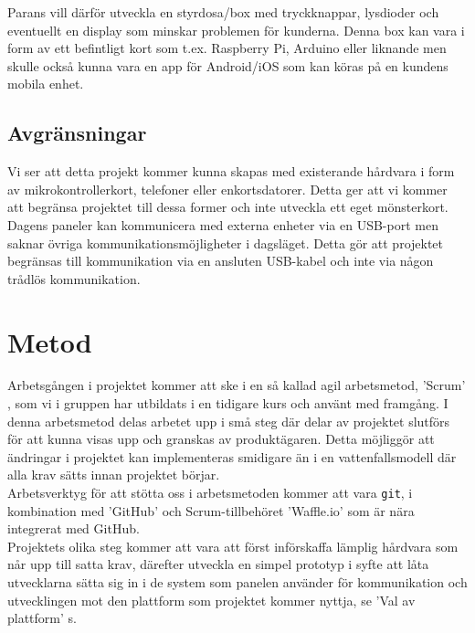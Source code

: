 \documentclass[a4paper]{article}
\begin{document}
			\noindent Parans vill därför utveckla en styrdosa/box med tryckknappar, lysdioder och eventuellt en display som minskar problemen för kunderna.
			Denna box kan vara i form av ett befintligt kort som t.ex. Raspberry Pi, Arduino eller liknande men skulle också kunna vara en app för Android/iOS som kan köras på en kundens mobila enhet.

		\subsection{Avgränsningar} %
		\label{sub:avgransningar}
			
			Vi ser att detta projekt kommer kunna skapas med existerande hårdvara i form av mikrokontrollerkort, telefoner eller enkortsdatorer. Detta ger att vi kommer att begränsa projektet till dessa former och inte utveckla ett eget mönsterkort.\\

			\noindent Dagens paneler kan kommunicera med externa enheter via en USB-port men saknar övriga kommunikationsmöjligheter i dagsläget. Detta gör att projektet begränsas till kommunikation via en ansluten USB-kabel och inte via någon trådlös kommunikation.


	\newpage

	\section{Metod} %
	\label{sec:metod}
		Arbetsgången i projektet kommer att ske i en så kallad agil arbetsmetod, 'Scrum' , som vi i gruppen har utbildats i en tidigare kurs och använt med framgång. I denna arbetsmetod delas arbetet upp i små steg där delar av projektet slutförs för att kunna visas upp och granskas av produktägaren. Detta möjliggör att ändringar i projektet kan implementeras smidigare än i en vattenfallsmodell där alla krav sätts innan projektet börjar. \\

		\noindent Arbetsverktyg för att stötta oss i arbetsmetoden kommer att vara \texttt{git}, i kombination med 'GitHub' och Scrum-tillbehöret 'Waffle.io'  som är nära integrerat med GitHub. \\

		\noindent Projektets olika steg kommer att vara att först införskaffa lämplig hårdvara som når upp till satta krav, därefter utveckla en simpel prototyp i syfte att låta utvecklarna sätta sig in i de system som panelen använder för kommunikation och utvecklingen mot den plattform som projektet kommer nyttja, se 'Val av plattform' s. \pageref{sec:val_av_plattform}
\end{document}
